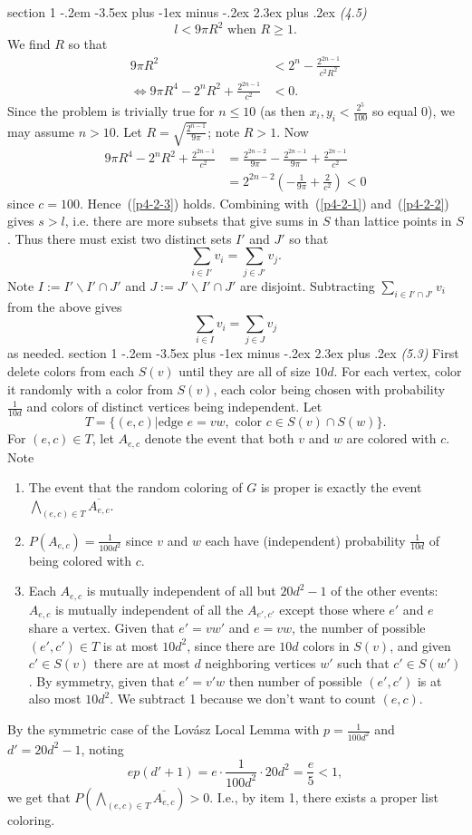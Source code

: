 \documentclass[12pt]{article}
\makeatletter
\theoremstyle{norm}
\newcommand{\rc}[1]{\frac{1}{#1}}
\newcommand{\pa}[1]{\left( {#1} \right)}
\newcommand{\bs}[0]{\backslash}
\newenvironment{problem}{\@startsection
       {section}
       {1}
       {-.2em}
       {-3.5ex plus -1ex minus -.2ex}
       {2.3ex plus .2ex}
       {\pagebreak[3]%
       \large\bf\noindent{Problem }
       }
       }
       {%
       }
\makeatother
\begin{document}
\begin{problem}{\it (4.5)}
\begin{equation}\label{p4-2-2}
l< 9\pi R^2\text{ when }R\ge 1.
\end{equation}
We find $R$ so that
\begin{align}
\label{p4-2-3}
9\pi R^2&<2^n-\frac{2^{2n-1}}{c^2 R^2}\\
\nonumber
\iff 9\pi R^4-2^nR^2+\frac{2^{2n-1}}{c^2}&<0.
\end{align}
Since the problem is trivially true for $n\le 10$ (as then $x_i,y_i<\frac{2^{5}}{100}$ so equal 0), we may assume $n>10$. 
Let $R=\sqrt{\frac{2^{n-1}}{9\pi}}$; note $R>1$. Now
\begin{align*}
9\pi R^4-2^nR^2+\frac{2^{2n-1}}{c^2}&=\frac{2^{2n-2}}{9\pi}-\frac{2^{2n-1}}{9\pi}+\frac{2^{2n-1}}{c^2}\\
&=2^{2n-2}\pa{-\frac{1}{9\pi}+\frac2{c^2}}<0
\end{align*}
since $c=100$. Hence~(\ref{p4-2-3}) holds. Combining with~(\ref{p4-2-1}) and~(\ref{p4-2-2}) gives $s>l$, i.e. there are more subsets that give sums in $S$ than lattice points in $S$. Thus there must exist two distinct sets $I'$ and $J'$ so that
\[
\sum_{i\in I'} v_i=\sum_{j\in J'} v_j.
\]
Note $I:=I'\bs I'\cap J'$ and $J:=J'\bs I'\cap J'$ are disjoint. 
Subtracting $\sum_{i\in I'\cap J'} v_i$ from the above gives
\[
\sum_{i\in I}v_i=\sum_{j\in J} v_j
\]
as needed.
\end{problem}
\begin{problem} {\it (5.3)}
First delete colors from each $S(v)$ until they are all of size $10d$. For each vertex, color it randomly with a color from $S(v)$, each color being chosen with probability $\rc{10d}$ and colors of distinct vertices being independent. 
Let 
\[T=\{(e,c)|\text{edge }e=vw,\text{ color }c\in S(v)\cap S(w)\}.\]
For $(e,c)\in T$, let $A_{e,c}$ denote the event that both $v$ and $w$ are colored with $c$. Note
\begin{enumerate}
\item The event that the random coloring of $G$ is proper is exactly the event $\bigwedge_{(e,c)\in T} \overline{A_{e,c}}$. 
\item
$P(A_{e,c})=\rc{100d^2}$ since $v$ and $w$ each have (independent) probability $\rc{10d}$ of being colored with $c$. 
\item
Each $A_{e,c}$ is mutually independent of all but $20d^2-1$ of the other events: $A_{e,c}$ is mutually independent of all the $A_{e',c'}$ except those where $e'$ and $e$ share a vertex. Given that $e'=vw'$ and $e=vw$, the number of possible $(e',c')\in T$ is at most $10d^2$, since there are $10d$ colors in $S(v)$, and given $c'\in S(v)$ there are at most $d$ neighboring vertices $w'$ such that $c'\in S(w')$. By symmetry, given that $e'=v'w$ then number of possible $(e',c')$ is at also most $10d^2$. We subtract 1 because we don't want to count $(e,c)$.
\end{enumerate}
By the symmetric case of the Lov\'asz Local Lemma with $p=\rc{100d^2}$ and $d'=20d^2-1$, noting
\[
ep(d'+1)=e\cdot \rc{100d^2}\cdot 20d^2=\frac e5<1,
\] 
we get that $P\pa{\bigwedge_{(e,c)\in T} \overline{A_{e,c}}}>0$. I.e., by item 1, there exists a proper list coloring.
\end{problem}
\end{document}
